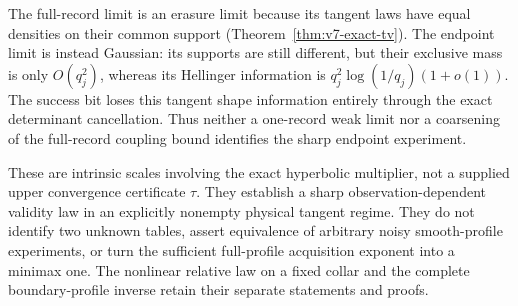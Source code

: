 The full-record limit is an erasure limit because its tangent laws have
equal densities on their common support
(Theorem~\ref{thm:v7-exact-tv}). The endpoint limit is instead Gaussian:
its supports are still different, but their exclusive mass is only
$O(q_j^2)$, whereas its Hellinger information is
$q_j^2\log(1/q_j)(1+o(1))$. The success bit loses this tangent shape
information entirely through the exact determinant cancellation. Thus
neither a one-record weak limit nor a coarsening of the full-record
coupling bound identifies the sharp endpoint experiment.

These are intrinsic scales involving the exact hyperbolic multiplier,
not a supplied upper convergence certificate $\tau$. They establish a
sharp observation-dependent validity law in an explicitly nonempty
physical tangent regime. They do not identify two unknown tables,
assert equivalence of arbitrary noisy smooth-profile experiments, or
turn the sufficient full-profile acquisition exponent into a minimax
one. The nonlinear relative law on a fixed collar and the complete
boundary-profile inverse retain their separate statements and proofs.
